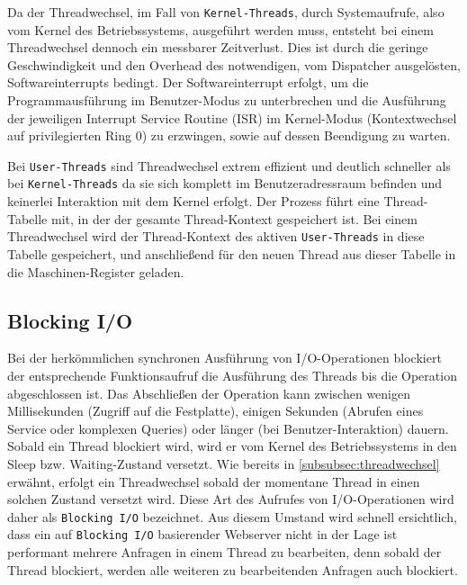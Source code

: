 \noindent
Da der Threadwechsel, im Fall von \verb|Kernel-Threads|, durch Systemaufrufe, also vom Kernel des Betriebssystems, ausgeführt werden muss, entsteht
bei einem Threadwechsel dennoch ein messbarer Zeitverlust.
Dies ist durch die geringe Geschwindigkeit und den Overhead des notwendigen, vom Dispatcher ausgelösten, Softwareinterrupts bedingt.
Der Softwareinterrupt erfolgt, um die Programmausführung im Benutzer-Modus zu unterbrechen und die Ausführung der jeweiligen Interrupt Service Routine (ISR) im
Kernel-Modus (Kontextwechsel auf privilegierten Ring 0) zu erzwingen, sowie auf dessen Beendigung zu warten.

Bei \verb|User-Threads| sind Threadwechsel extrem effizient und deutlich schneller als bei \verb|Kernel-Threads|
da sie sich komplett im Benutzeradressraum befinden und keinerlei Interaktion mit dem Kernel erfolgt.
Der Prozess führt eine Thread-Tabelle mit, in der der gesamte Thread-Kontext gespeichert ist.
Bei einem Threadwechsel wird der Thread-Kontext des aktiven \verb|User-Threads| in diese Tabelle gespeichert, und anschließend für den neuen Thread
aus dieser Tabelle in die Maschinen-Register geladen.
\parencite[Kapitel 2.2.6 Thread Scheduling]{Tanenbaum2016}
\newpage
\subsection{Blocking I/O}
\label{subsec:blocking-i/o}
Bei der herkömmlichen synchronen Ausführung von I/O-Operationen blockiert der entsprechende Funktionsaufruf die Ausführung des
Threads bis die Operation abgeschlossen ist. Das Abschließen der Operation kann zwischen wenigen Millisekunden (Zugriff auf die Festplatte),
einigen Sekunden (Abrufen eines Service oder komplexen Queries) oder länger (bei Benutzer-Interaktion) dauern.
Sobald ein Thread blockiert wird, wird er vom Kernel des Betriebssystems in den Sleep bzw. Waiting-Zustand versetzt.
Wie bereits in \ref{subsubsec:threadwechsel} erwähnt, erfolgt ein Threadwechsel sobald der momentane Thread in einen solchen Zustand
versetzt wird.
Diese Art des Aufrufes von I/O-Operationen wird daher als \verb|Blocking I/O| bezeichnet.
Aus diesem Umstand wird schnell ersichtlich, dass ein auf \verb|Blocking I/O| basierender Webserver nicht in der Lage ist
performant mehrere Anfragen in einem Thread zu bearbeiten, denn sobald der Thread blockiert, werden alle weiteren zu bearbeitenden Anfragen
auch blockiert.
